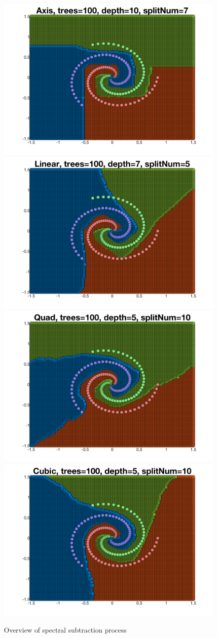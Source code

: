 \documentclass[a4paper,pra,twocolumn,10pt,aps,longbibliography,nobalancelastpage]{revtex4-1}
\begin{document}
\begin{figure}[H]
	\centering
    \includegraphics[width=0.40\columnwidth]{axis}
	\includegraphics[width=0.40\columnwidth]{linear}
    \includegraphics[width=0.40\columnwidth]{quad}
    \includegraphics[width=0.40\columnwidth]{cubic}
    \caption{Overview of spectral subtraction process}
\end{figure}
\end{document}
